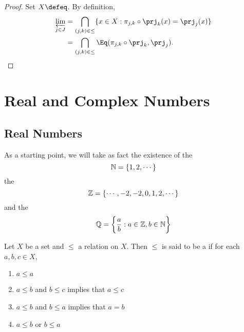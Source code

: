 \documentclass{book}
\begin{document}
\begin{proof}
	Set $X \defeq $. By definition, 
	\begin{align*}
		\varprojlim\limits_{j \in J}
		& = \bigcap\limits_{(j,k) \in {\leq}} \{x \in X: \pi_{j,k} \circ \prj_k(x) = \prj_j(x)\} \\
		& = \bigcap\limits_{(j,k) \in {\leq}} \Eq( \pi_{j,k} \circ \prj_k,  \prj_j).
	\end{align*}
\end{proof}


















































	\newpage
	\chapter{Real and Complex Numbers}
	
	\section{Real Numbers}
	\begin{note}
		As a starting point, we will take as fact the existence of the  $$\mathbb{N} = \{1, 2, \cdots\}$$ the  $$\mathbb{Z} = \{\cdots, -2, -2, 0, 1, 2, \cdots\}$$ and the  $$\mathbb{Q} = \bigg \{\frac{a}{b}: a \in \mathbb{Z}, b \in \mathbb{N} \bigg \}$$
	\end{note}
	
	\begin{defn} \ld{}
		Let $X$ be a set and $\leq$ a relation on $X$. Then $\leq$ is said to be a  if for each $a,b,c \in X$,
		\begin{enumerate}
			\item $a \leq a$
			\item $a \leq b$ and $b \leq c$ implies that $a \leq  c$ 
			\item $a \leq b$ and $b \leq a$ implies that $a = b$ 
			\item $a \leq b$ or $b \leq a$
		\end{enumerate}
	\end{defn}
\end{document}
